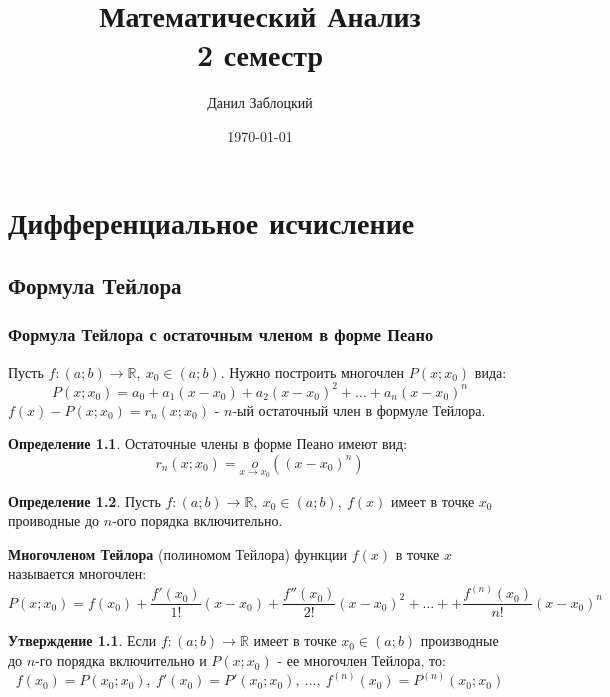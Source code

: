 \documentclass{report}
\title{Математический Анализ \\ 2 семестр}
\author{Данил Заблоцкий}
\date{\today}
\theoremstyle{definition}
\newtheorem{definition}{Определение}[section]
\newtheorem{statement}{Утверждение}[section]
\begin{document}
\maketitle
\tableofcontents
\chapter{Дифференциальное исчисление}

\section{Формула Тейлора}

\subsection{Формула Тейлора с остаточным членом в форме Пеано}

Пусть $f:(a;b)\rightarrow\mathbb{R}, \ x_0 \in (a;b)$. Нужно построить многочлен $P(x;x_0)$ вида:
\begin{equation*}
  P(x;x_0)=a_0 + a_1(x-x_0) + a_2(x-x_0)^2 + \ldots + a_n (x-x_0)^n
\end{equation*}
$f(x) - P(x;x_0) = r_n (x;x_0)$ - $n$-ый остаточный член в формуле Тейлора.

\begin{definition}
  Остаточные члены в форме Пеано имеют вид:
  \begin{equation*}
    r_n(x;x_0) = \underset{x\rightarrow x_0}{o}((x-x_0)^n)
  \end{equation*}
\end{definition}

\begin{definition}
  Пусть $f:(a;b)\rightarrow\mathbb{R}, \ x_0\in(a;b), \ f(x)$ имеет в точке $x_0$ проиводные до
  $n$-ого порядка включительно.

  \textbf{Многочленом Тейлора} (полиномом Тейлора) функции $f(x)$ в точке $x$ называется многочлен:
  \begin{equation*}
    P(x;x_0) = f(x_0) + \frac{f'(x_0)}{1!}(x-x_0) + \frac{f''(x_0)}{2!}(x-x_0)^2 + \ldots +
    + \frac{f^{(n)}(x_0)}{n!}(x-x_0)^n
  \end{equation*}
\end{definition}


\begin{statement}
  Если $f:(a;b)\rightarrow\mathbb{R}$ имеет в точке $x_0\in(a;b)$ производные до $n$-го порядка
  включительно и $P(x;x_0)$ - ее многочлен Тейлора, то:
  \begin{equation*}
    f(x_0) = P(x_0;x_0), \ f'(x_0) = P'(x_0;x_0), \ \ldots, \ f^{(n)}(x_0) = P^{(n)}(x_0;x_0)
  \end{equation*}
\end{statement}
\end{document}
